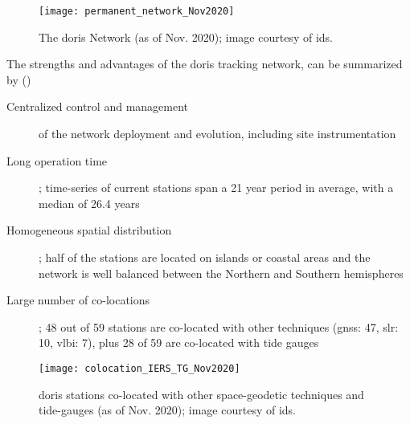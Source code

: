 \begin{figure}
  \centering
  \texttt{[image: permanent\_network\_Nov2020]}
  \caption{The \gls{doris} Network (as of Nov. 2020); image courtesy of \gls{ids}.}
  \label{fig:doris-network}
\end{figure}

The strengths and advantages of the \gls{doris} tracking network, can be summarized 
by (\cite{Soudarin2019})
\begin{description}
  \item[Centralized control and management] of the network deployment and evolution, 
    including site instrumentation
  \item[Long operation time]; time-series of current stations span a 21 year period in average, 
    with a median of 26.4 years
  \item[Homogeneous spatial distribution]; half of the stations are located on 
    islands or coastal areas and the network is well balanced between the 
    Northern and Southern hemispheres
  \item[Large number of co-locations]; 48 out of 59 stations are co-located with 
    other techniques (\gls{gnss}: 47, \gls{slr}: 10, \gls{vlbi}: 7), plus 28 of 59 are 
    co-located with tide gauges
\end{description}

\begin{figure}
  \centering
  \texttt{[image: colocation\_IERS\_TG\_Nov2020]}
  \caption{\gls{doris} stations co-located with other space-geodetic techniques and tide-gauges (as of Nov. 2020); image courtesy of \gls{ids}.}
  \label{fig:doris-constellations}
\end{figure}

\iffalse
\fi
